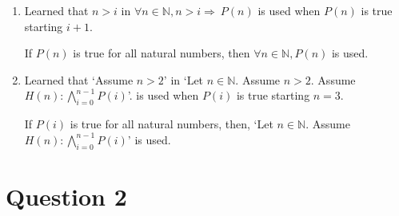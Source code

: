 \documentclass[12pt]{article}
\begin{document}
\begin{enumerate}[1.]
    \item Learned that $n > i$ in $\forall n \in \mathbb{N}, n > i \Rightarrow \:P(n)$
    is used when $P(n)$ is true starting $i + 1$.

    \bigskip

    If $P(n)$ is true for all natural numbers, then $\forall n \in \mathbb{N}, P(n)$
    is used.

    \item Learned that `Assume $n > 2$' in `Let $n \in \mathbb{N}$. Assume $n > 2$.
    Assume $H(n):\bigwedge\limits_{i=0}^{n-1} P(i)$'. is used
    when $P(i)$ is true starting $n = 3$.

    \bigskip

    If $P(i)$ is true for all natural numbers, then, `Let $n \in \mathbb{N}$. Assume
    $H(n):\bigwedge\limits_{i=0}^{n-1} P(i)$' is used.

\end{enumerate}

\section*{Question 2}
\end{document}
